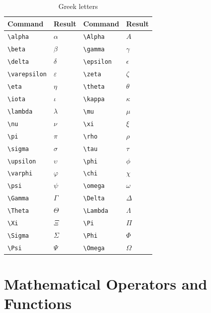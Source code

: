 \begin{table}[H]
\centering
\begin{tabular}{llll}
\toprule
\textbf{Command} & \textbf{Result} & \textbf{Command} & \textbf{Result} \\
\midrule
\verb|\alpha|     & $\alpha$     & \verb|\Alpha|     & $A$ \\
\verb|\beta|      & $\beta$      & \verb|\gamma|     & $\gamma$ \\
\verb|\delta|     & $\delta$     & \verb|\epsilon|   & $\epsilon$ \\
\verb|\varepsilon|& $\varepsilon$& \verb|\zeta|      & $\zeta$ \\
\verb|\eta|       & $\eta$       & \verb|\theta|     & $\theta$ \\
\verb|\iota|      & $\iota$      & \verb|\kappa|     & $\kappa$ \\
\verb|\lambda|    & $\lambda$    & \verb|\mu|        & $\mu$ \\
\verb|\nu|        & $\nu$        & \verb|\xi|        & $\xi$ \\
\verb|\pi|        & $\pi$        & \verb|\rho|       & $\rho$ \\
\verb|\sigma|     & $\sigma$     & \verb|\tau|       & $\tau$ \\
\verb|\upsilon|   & $\upsilon$   & \verb|\phi|       & $\phi$ \\
\verb|\varphi|    & $\varphi$    & \verb|\chi|       & $\chi$ \\
\verb|\psi|       & $\psi$       & \verb|\omega|     & $\omega$ \\
\midrule
\verb|\Gamma|     & $\Gamma$     & \verb|\Delta|     & $\Delta$ \\
\verb|\Theta|     & $\Theta$     & \verb|\Lambda|    & $\Lambda$ \\
\verb|\Xi|        & $\Xi$        & \verb|\Pi|        & $\Pi$ \\
\verb|\Sigma|     & $\Sigma$     & \verb|\Phi|       & $\Phi$ \\
\verb|\Psi|       & $\Psi$       & \verb|\Omega|     & $\Omega$ \\
\bottomrule
\end{tabular}
\caption{Greek letters}
\end{table}

\section{Mathematical Operators and Functions}

